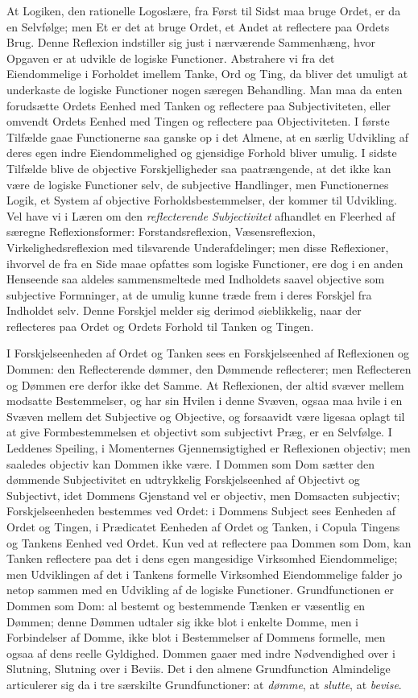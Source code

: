 \documentclass[12pt]{book}
\newcommand{\opage}[1]{\marginnote{\footnotesize\textit{[#1]}}}
\begin{document}
At Logiken, den rationelle Logoslære, fra Først til Sidst maa bruge Ordet, er da en Selvfølge; men Et er det at bruge Ordet, et Andet at reflectere paa Ordets Brug. Denne Reflexion indstiller sig just i nærværende Sammenhæng, hvor Opgaven er at udvikle de logiske Functioner. Abstrahere vi fra det Eiendommelige i Forholdet imellem Tanke, Ord og Ting, da bliver det umuligt at underkaste de logiske Functioner nogen særegen Behandling. Man maa da enten forudsætte Ordets Eenhed med Tanken og reflectere paa Subjectiviteten, eller omvendt Ordets Eenhed med Tingen og reflectere paa Objectiviteten. I første Tilfælde gaae Functionerne saa ganske op i det Almene, at en særlig Udvikling af deres egen indre Eiendommelighed og gjensidige Forhold bliver umulig. I sidste Tilfælde blive de objective Forskjelligheder saa paatrængende, at det ikke kan være de logiske Functioner selv, de subjective Handlinger, men Functionernes Logik, et System af objective Forholdsbestemmelser, der kommer til Udvikling. Vel have vi i Læren om den \emph{reflecterende Subjectivitet} afhandlet en Fleerhed af særegne Reflexionsformer: Forstandsreflexion, Væsensreflexion, Virkelighedsreflexion med tilsvarende Underafdelinger; men disse Reflexioner, ihvorvel de fra en Side maae opfattes som logiske Functioner, ere dog i en anden Henseende saa aldeles sammensmeltede med Indholdets saavel objective som subjective Formninger, at de umulig kunne træde frem i deres Forskjel fra
\opage{12}Indholdet selv. Denne Forskjel melder sig derimod øieblikkelig, naar der reflecteres paa Ordet og Ordets Forhold til Tanken og Tingen.

I Forskjelseenheden af Ordet og Tanken sees en Forskjelseenhed af Reflexionen og Dommen: den Reflecterende dømmer, den Dømmende reflecterer; men Reflecteren og Dømmen ere derfor ikke det Samme. At Reflexionen, der altid svæver mellem modsatte Bestemmelser, og har sin Hvilen i denne Svæven, ogsaa maa hvile i en Svæven mellem det Subjective og Objective, og forsaavidt være ligesaa oplagt til at give Formbestemmelsen et objectivt som subjectivt Præg, er en Selvfølge. I Leddenes Speiling, i Momenternes Gjennemsigtighed er Reflexionen objectiv; men saaledes objectiv kan Dommen ikke være. I Dommen som Dom sætter den dømmende Subjectivitet en udtrykkelig Forskjelseenhed af Objectivt og Subjectivt, idet Dommens Gjenstand vel er objectiv, men Domsacten subjectiv; Forskjelseenheden bestemmes ved Ordet: i Dommens Subject sees Eenheden af Ordet og Tingen, i Prædicatet Eenheden af Ordet og Tanken, i Copula Tingens og Tankens Eenhed ved Ordet. Kun ved at reflectere paa Dommen som Dom, kan Tanken reflectere paa det i dens egen mangesidige Virksomhed Eiendommelige; men Udviklingen af det i Tankens formelle Virksomhed Eiendommelige falder jo netop sammen med en Udvikling af de logiske Functioner. Grundfunctionen er Dommen som Dom: al bestemt og bestemmende Tænken er væsentlig en Dømmen; denne Dømmen udtaler sig ikke blot i enkelte Domme, men i Forbindelser af Domme, ikke blot i Bestemmelser af Dommens formelle, men ogsaa af dens reelle Gyldighed. Dommen gaaer med indre Nødvendighed over i Slutning, Slutning over i Beviis. Det i den almene Grundfunction Almindelige articulerer sig da i tre særskilte Grundfunctioner: at \emph{dømme}, at \emph{slutte}, at \emph{bevise}.
\end{document}
